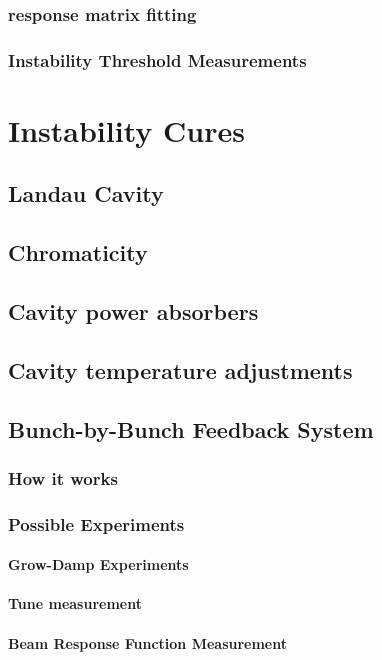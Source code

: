 \documentclass[
	12pt,				%
	openright,			%
	oneside,			%
	a4paper,		%
	chapter=TITLE,		%
	section=TITLE,		%
    brazil,				%
	english,			%
	sumario=tradicional,
	]{abntex2}
\begin{document}
      \subsubsection{response matrix fitting}
      \subsubsection{Instability Threshold Measurements}
  \section{Instability Cures}
    \subsection{Landau Cavity}
    \subsection{Chromaticity}
    \subsection{Cavity power absorbers}
    \subsection{Cavity temperature adjustments}
    \subsection{Bunch-by-Bunch Feedback System}
      \subsubsection{How it works}
      \subsubsection{Possible Experiments}
        \paragraph{Grow-Damp Experiments}
        \paragraph{Tune measurement}
        \paragraph{Beam Response Function Measurement}
\end{document}
